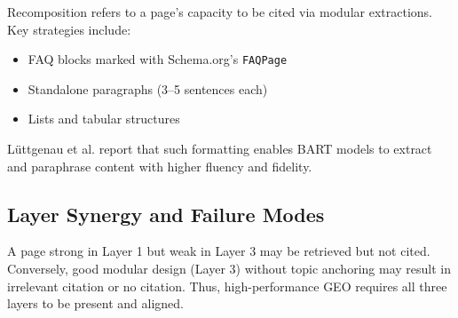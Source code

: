Recomposition refers to a page’s capacity to be cited via modular extractions. Key strategies include:
\begin{itemize}
  \item FAQ blocks marked with Schema.org’s \texttt{FAQPage}
  \item Standalone paragraphs (3--5 sentences each)
  \item Lists and tabular structures
\end{itemize}
L\"uttgenau et al. \cite{luttgenau2025beyondseo} report that such formatting enables BART models to extract and paraphrase content with higher fluency and fidelity.

\subsection{Layer Synergy and Failure Modes}

A page strong in Layer 1 but weak in Layer 3 may be retrieved but not cited. Conversely, good modular design (Layer 3) without topic anchoring may result in irrelevant citation or no citation. Thus, high-performance GEO requires all three layers to be present and aligned.
